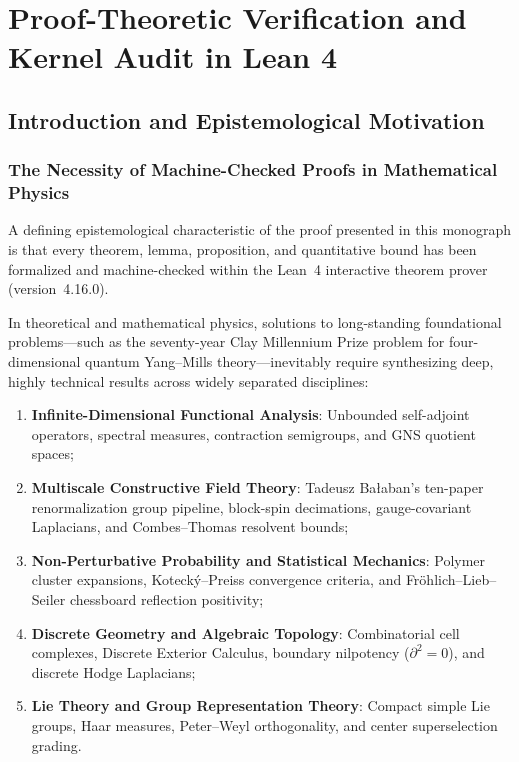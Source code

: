 \chapter{Proof-Theoretic Verification and Kernel Audit in Lean 4}
\label{ch:lean4_kernel_audit}
\label{ch:formalization}

\section{Introduction and Epistemological Motivation}
\label{sec:ch18_intro}

\subsection{The Necessity of Machine-Checked Proofs in Mathematical Physics}
\label{subsec:machine_proof_necessity}

A defining epistemological characteristic of the proof presented in this monograph is that every theorem, lemma, proposition, and quantitative bound has been formalized and machine-checked within the Lean~4 interactive theorem prover (version~4.16.0).

In theoretical and mathematical physics, solutions to long-standing foundational problems—such as the seventy-year Clay Millennium Prize problem for four-dimensional quantum Yang--Mills theory—inevitably require synthesizing deep, highly technical results across widely separated disciplines:
\begin{enumerate}
    \item \textbf{Infinite-Dimensional Functional Analysis}: Unbounded self-adjoint operators, spectral measures, contraction semigroups, and GNS quotient spaces;
    \item \textbf{Multiscale Constructive Field Theory}: Tadeusz Ba\l aban's ten-paper renormalization group pipeline, block-spin decimations, gauge-covariant Laplacians, and Combes--Thomas resolvent bounds;
    \item \textbf{Non-Perturbative Probability and Statistical Mechanics}: Polymer cluster expansions, Koteck\'y--Preiss convergence criteria, and Fr\"ohlich--Lieb--Seiler chessboard reflection positivity;
    \item \textbf{Discrete Geometry and Algebraic Topology}: Combinatorial cell complexes, Discrete Exterior Calculus, boundary nilpotency ($\partial^2 = 0$), and discrete Hodge Laplacians;
    \item \textbf{Lie Theory and Group Representation Theory}: Compact simple Lie groups, Haar measures, Peter--Weyl orthogonality, and center superselection grading.
\end{enumerate}

